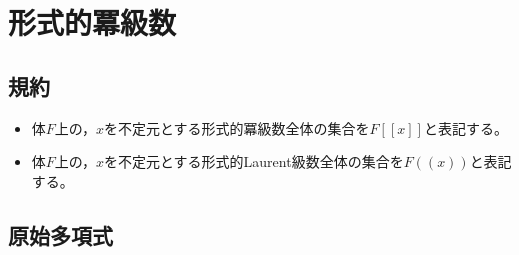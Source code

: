 \chapter{形式的冪級数}
    \section{規約}
        \begin{itemize}
            \item 体$F$上の，$x$を不定元とする形式的冪級数全体の集合を$F[[x]]$と表記する。
            \item 体$F$上の，$x$を不定元とする形式的Laurent級数全体の集合を$F((x))$と表記する。
        \end{itemize}
    \section{原始多項式}
